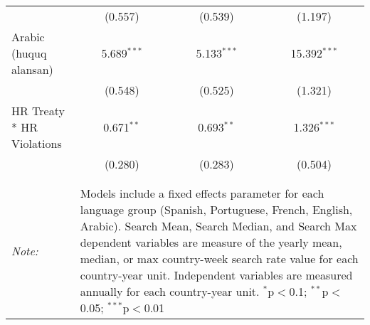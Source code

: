 \begin{table}[!htbp]
\begin{tabular}{@{\extracolsep{5pt}}lccc}
  & (0.557) & (0.539) & (1.197) \\ 
  Arabic (huquq alansan) & 5.689$^{***}$ & 5.133$^{***}$ & 15.392$^{***}$ \\ 
  & (0.548) & (0.525) & (1.321) \\ 
  HR Treaty * HR Violations & 0.671$^{**}$ & 0.693$^{**}$ & 1.326$^{***}$ \\ 
  & (0.280) & (0.283) & (0.504) \\ 
 \hline \\[-1.8ex] 
\hline 
\hline \\[-1.8ex] 
\textit{Note:}  & \multicolumn{3}{l}{\parbox[t]{8cm}{Models include a fixed effects parameter for each language group (Spanish, Portuguese, French, English, Arabic). Search Mean, Search Median, and Search Max dependent variables are measure of the yearly mean, median, or max country-week search rate value for each country-year unit. Independent variables are measured annually for each country-year unit. $^{*}$p$<$0.1; $^{**}$p$<$0.05; $^{***}$p$<$0.01}} \\ 
\end{tabular} 
\end{table} 
